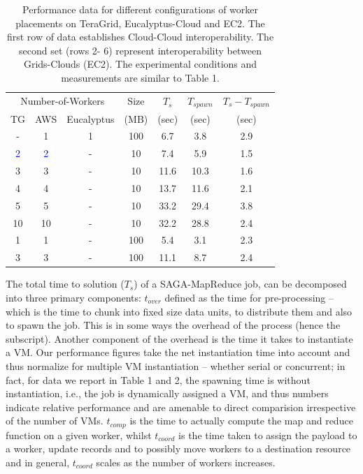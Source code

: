\documentclass[conference,final]{IEEEtran}
\newcommand{\sagamapreduce }{SAGA-MapReduce }
\newcommand{\upp}{\vspace*{-0.5em}}
\begin{document}
\begin{table}
\upp
\begin{tabular}{ccccccc}
  \hline
  \multicolumn{3}{c}{Number-of-Workers}  &  Size   &  $T_s$  & $T_{spawn}$ & $T_s - T_{spawn}$\\   
  TG &  AWS & Eucalyptus &  (MB)  & (sec) & (sec) & (sec) \\
  \hline
  - & 1 & 1 & 100  & 6.7 & 3.8 & 2.9\\
  \hline 
  \textcolor{blue}{2} &   \textcolor{blue}{2} & - & 10 & 7.4 & 5.9 & 1.5 \\
  3 & 3 & - & 10 & 11.6 & 10.3 & 1.6 \\
  4 & 4 & - & 10 & 13.7 & 11.6 & 2.1 \\
  5 & 5 & - & 10 & 33.2 & 29.4 & 3.8 \\ 
  10 & 10 & - & 10 & 32.2 & 28.8 & 2.4 \\
  \hline
  \hline 
  1 & 1 & - & 100 & 5.4 & 3.1 & 2.3\\
  3 & 3 & - & 100 & 11.1 & 8.7 & 2.4 \\
\end{tabular}
\upp
\caption{Performance data for different configurations of worker placements
  on TeraGrid, Eucalyptus-Cloud and EC2. The first row of data
  establishes Cloud-Cloud interoperability. The second set (rows 2- 6)    represent  interoperability between Grids-Clouds (EC2). The experimental 
  conditions and measurements are similar to Table 1.}
\label{stuff}
\upp
\upp
\end{table}

The total time to solution ($T_s$) of a \sagamapreduce job, can be
decomposed into three primary components: $t_{over}$ defined as the
time for pre-processing -- which is the time to chunk into fixed size
data units, to distribute them and also to spawn the job. This is in
some ways the overhead of the process (hence the subscript).  Another
component of the overhead is the time it takes to instantiate a VM. %
Our performance figures take the net instantiation time into account
and thus normalize for multiple VM instantiation -- whether serial or
concurrent; in fact, for data we report in Table 1 and 2, the spawning
time is without instantiation, i.e., the job is dynamically assigned a
VM, and thus numbers indicate relative performance and are amenable to
direct comparision irrespective of the number of VMs.  $t_{comp}$ is
the time to actually compute the map and reduce function on a given
worker, whilst $t_{coord}$ is the time taken to assign the payload to
a worker, update records and to possibly move workers to a destination
resource and in general, $t_{coord}$ scales as the number of workers
increases. 
\end{document}
